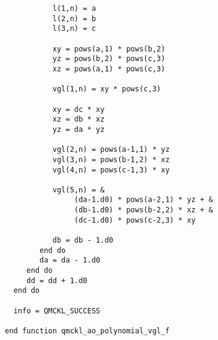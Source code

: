 \begin{verbatim}
           l(1,n) = a
           l(2,n) = b
           l(3,n) = c

           xy = pows(a,1) * pows(b,2)
           yz = pows(b,2) * pows(c,3)
           xz = pows(a,1) * pows(c,3)

           vgl(1,n) = xy * pows(c,3)

           xy = dc * xy
           xz = db * xz
           yz = da * yz

           vgl(2,n) = pows(a-1,1) * yz
           vgl(3,n) = pows(b-1,2) * xz
           vgl(4,n) = pows(c-1,3) * xy

           vgl(5,n) = &
                (da-1.d0) * pows(a-2,1) * yz + &
                (db-1.d0) * pows(b-2,2) * xz + &
                (dc-1.d0) * pows(c-2,3) * xy

           db = db - 1.d0
        end do
        da = da - 1.d0
     end do
     dd = dd + 1.d0
  end do

  info = QMCKL_SUCCESS

end function qmckl_ao_polynomial_vgl_f
\end{verbatim}


